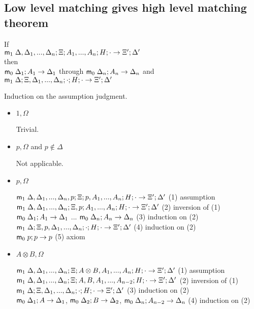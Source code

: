 \documentclass[9pt]{article}
\begin{document}
\subsection{Low level matching gives high level matching theorem}

If \\
$\mathsf{m}_1 \; \Delta, \Delta_1, ..., \Delta_n; \Xi; A_1, ..., A_n; H; \cdot \rightarrow \Xi'; \Delta'$ \\
then \\
$\mathsf{m}_0 \; \Delta_1; A_1 \rightarrow \Delta_1$ through $\mathsf{m}_0 \; \Delta_n; A_n \rightarrow \Delta_n$ and \\
$\mathsf{m}_1 \; \Delta; \Xi, \Delta_1, ..., \Delta_n; \cdot; H; \cdot \rightarrow \Xi'; \Delta'$

Induction on the assumption judgment.

\begin{itemize}
\item $1, \Omega$

Trivial.

\item $p, \Omega$ and $p \notin \Delta$

Not applicable.

\item $p, \Omega$

$\mathsf{m}_1 \; \Delta, \Delta_1, ..., \Delta_n, p; \Xi; p, A_1, ..., A_n; H; \cdot \rightarrow \Xi'; \Delta'$ \hfill (1) assumption \\
$\mathsf{m}_1 \; \Delta, \Delta_1, ..., \Delta_n; \Xi, p; A_1, ..., A_n; H; \cdot \rightarrow \Xi'; \Delta'$ \hfill (2) inversion of (1) \\
$\mathsf{m}_0 \; \Delta_1 ; A_1 \rightarrow \Delta_1$ ... $\mathsf{m}_0 \; \Delta_n ; A_n \rightarrow \Delta_n$ \hfill (3) induction on (2) \\
$\mathsf{m}_1 \; \Delta; \Xi, p, \Delta_1, ..., \Delta_n; \cdot ; H ; \cdot \rightarrow \Xi'; \Delta'$ \hfill (4) induction on (2) \\
$\mathsf{m}_0 \; p; p \rightarrow p$ \hfill (5) axiom \\

\item $A \otimes B, \Omega$

$\mathsf{m}_1 \; \Delta, \Delta_1, ..., \Delta_n; \Xi; A \otimes B, A_1, ..., A_n; H; \cdot \rightarrow \Xi'; \Delta'$ \hfill (1) assumption \\
$\mathsf{m}_1 \; \Delta, \Delta_1, ..., \Delta_n; \Xi; A, B, A_1, ..., A_{n-2}; H; \cdot \rightarrow \Xi'; \Delta'$ \hfill (2) inversion of (1) \\
$\mathsf{m}_1 \; \Delta; \Xi, \Delta_1, ..., \Delta_n; \cdot ; H; \cdot \rightarrow \Xi'; \Delta'$ \hfill (3) induction on (2) \\
$\mathsf{m}_0 \; \Delta_1 ; A \rightarrow \Delta_1$, $\mathsf{m}_0 \; \Delta_2; B \rightarrow \Delta_2$, $\mathsf{m}_0 \; \Delta_n; A_{n-2} \rightarrow \Delta_n$ \hfill (4) induction on (2) \\


\end{itemize}
\end{document}
